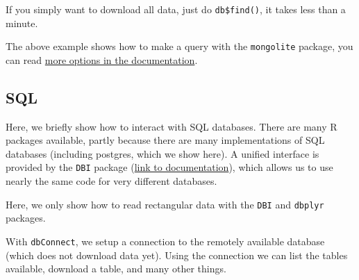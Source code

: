 \documentclass[]{book}
\newenvironment{Shaded}{\begin{snugshade}}{\end{snugshade}}
\newcommand{\CommentTok}[1]{\textcolor[rgb]{0.56,0.35,0.01}{\textit{#1}}}
\newcommand{\DataTypeTok}[1]{\textcolor[rgb]{0.13,0.29,0.53}{#1}}
\newcommand{\DecValTok}[1]{\textcolor[rgb]{0.00,0.00,0.81}{#1}}
\newcommand{\KeywordTok}[1]{\textcolor[rgb]{0.13,0.29,0.53}{\textbf{#1}}}
\newcommand{\NormalTok}[1]{#1}
\newcommand{\OperatorTok}[1]{\textcolor[rgb]{0.81,0.36,0.00}{\textbf{#1}}}
\newcommand{\StringTok}[1]{\textcolor[rgb]{0.31,0.60,0.02}{#1}}
\let\BeginKnitrBlock\begin \let\EndKnitrBlock\end
\begin{document}
\begin{Shaded}
\end{Shaded}

If you simply want to download all data, just do \texttt{db\$find()}, it takes less than a minute.

\BeginKnitrBlock{rmdreading}
The above example shows how to make a query with the \texttt{mongolite} package, you can read \href{https://jeroen.github.io/mongolite/query-data.html}{more options in the documentation}.
\EndKnitrBlock{rmdreading}

\hypertarget{sql}{%
\subsection{SQL}\label{sql}}

Here, we briefly show how to interact with SQL databases. There are many R packages available, partly because there are many implementations of SQL databases (including postgres, which we show here). A unified interface is provided by the \texttt{DBI} package (\href{https://db.rstudio.com/dbi/}{link to documentation}), which allows us to use nearly the same code for very different databases.

Here, we only show how to read rectangular data with the \texttt{DBI} and \texttt{dbplyr} packages.

With \texttt{dbConnect}, we setup a connection to the remotely available database (which does not download data yet). Using the connection we can list the tables available, download a table, and many other things.
\end{document}
